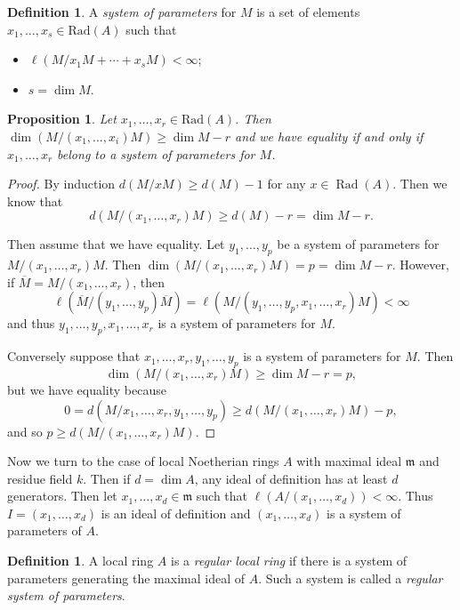 \documentclass[leqno, openany]{memoir}
\newtheorem{prop}[thm]{Proposition}
\theoremstyle{definition}
\newtheorem{defn}[thm]{Definition}
\theoremstyle{remark}
\theoremstyle{plain}
\theoremstyle{definition}
\theoremstyle{remark}
\newcommand{\mf}[1]{\mathfrak{#1}}
\newcommand{\mr}[1]{\mathrm{#1}}
\newcommand{\ol}[1]{\overline{#1}}
\DeclareMathOperator{\Rad}{Rad}
\begin{document}
\begin{defn}
    A \textit{system of parameters} for $M$ is a set of elements $x_1, \ldots, x_s \in \mr{Rad}(A)$ such that
    \begin{itemize}
        \item $\ell(M / x_1 M + \cdots + x_s M) < \infty$;
        \item $s = \dim M$.
    \end{itemize}
\end{defn}

\begin{prop}
    Let $x_1, \ldots, x_r \in \mr{Rad}(A)$. Then $\dim (M / (x_1, \ldots, x_i)M) \geq \dim M - r$ and we have equality if and only if $x_1, \ldots, x_r$ belong to a system of parameters for $M$.
\end{prop}

\begin{proof}
    By induction $d(M / xM) \geq d(M) - 1$ for any $x \in \Rad (A)$. Then we know that 
    \[ d(M / (x_1, \ldots, x_r)M) \geq d(M) - r = \dim M - r. \]

    Then assume that we have equality. Let $y_1, \ldots, y_p$ be a system of parameters for $M / (x_1, \ldots, x_r)M$. Then $\dim(M / (x_1, \ldots, x_r)M) = p = \dim M - r$. However, if $\ol{M} = M / (x_1, \ldots, x_r)$, then
    \[ \ell(\ol{M} / (y_1, \ldots, y_p) \ol{M}) = \ell(M / (y_1, \ldots, y_p, x_1, \ldots, x_r)M) < \infty \]
    and thus $y_1, \ldots, y_p, x_1, \ldots, x_r$ is a system of parameters for $M$.

    Conversely suppose that $x_1, \ldots, x_r, y_1, \ldots, y_p$ is a system of parameters for $M$. Then 
    \[ \dim(M / (x_1, \ldots, x_r)M) \geq \dim M - r = p, \] 
    but we have equality because
    \[ 0 = d(M / x_1, \ldots, x_r, y_1, \ldots, y_p) \geq d(M / (x_1, \ldots, x_r)M) - p, \]
    and so $p \geq d(M / (x_1, \ldots, x_r)M)$.
\end{proof}

Now we turn to the case of local Noetherian rings $A$ with maximal ideal $\mf{m}$ and residue field $k$. Then if $d = \dim A$, any ideal of definition has at least $d$ generators. Then let $x_1, \ldots, x_d \in \mf{m}$ such that $\ell(A / (x_1, \ldots, x_d)) < \infty$. Thus $I = (x_1, \ldots, x_d)$ is an ideal of definition and $(x_1, \ldots, x_d)$ is a system of parameters of $A$.

\begin{defn}
    A local ring $A$ is a \textit{regular local ring} if there is a system of parameters generating the maximal ideal of $A$. Such a system is called a \textit{regular system of parameters}.  
\end{defn}
\end{document}
